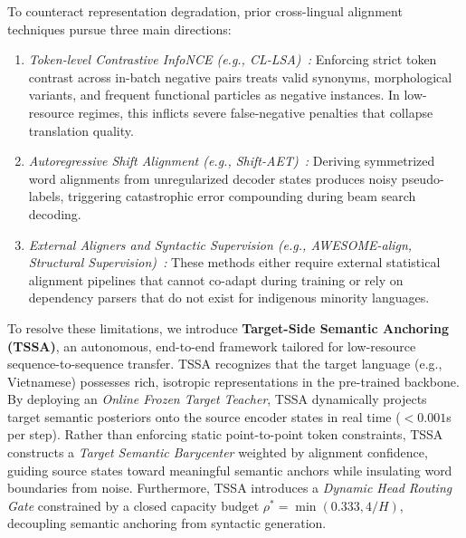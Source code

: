 \documentclass[11pt]{article}
\begin{document}
To counteract representation degradation, prior cross-lingual alignment techniques pursue three main directions:
\begin{enumerate}[leftmargin=*]
    \item \textit{Token-level Contrastive InfoNCE (e.g., CL-LSA)~\cite{chi2021infoxlm}:} Enforcing strict token contrast across in-batch negative pairs treats valid synonyms, morphological variants, and frequent functional particles as negative instances. In low-resource regimes, this inflicts severe false-negative penalties that collapse translation quality.
    \item \textit{Autoregressive Shift Alignment (e.g., Shift-AET)~\cite{chen2020accurate}:} Deriving symmetrized word alignments from unregularized decoder states produces noisy pseudo-labels, triggering catastrophic error compounding during beam search decoding.
    \item \textit{External Aligners and Syntactic Supervision (e.g., AWESOME-align, Structural Supervision)~\cite{dou2021word,li2022structural}:} These methods either require external statistical alignment pipelines that cannot co-adapt during training or rely on dependency parsers that do not exist for indigenous minority languages.
\end{enumerate}

To resolve these limitations, we introduce \textbf{Target-Side Semantic Anchoring (TSSA)}, an autonomous, end-to-end framework tailored for low-resource sequence-to-sequence transfer. TSSA recognizes that the target language (e.g., Vietnamese) possesses rich, isotropic representations in the pre-trained backbone. By deploying an \textit{Online Frozen Target Teacher}, TSSA dynamically projects target semantic posteriors onto the source encoder states in real time ($< 0.001$s per step). Rather than enforcing static point-to-point token constraints, TSSA constructs a \textit{Target Semantic Barycenter} weighted by alignment confidence, guiding source states toward meaningful semantic anchors while insulating word boundaries from noise. Furthermore, TSSA introduces a \textit{Dynamic Head Routing Gate} constrained by a closed capacity budget $\rho^* = \min(0.333, 4/H)$, decoupling semantic anchoring from syntactic generation.
\end{document}
